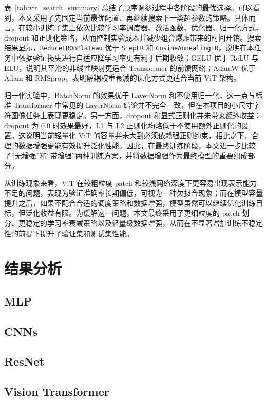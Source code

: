 \documentclass[12pt,hyperref,a4paper,UTF8]{ctexart}
\begin{document}
\noindent 表~\ref{tab:vit_search_summary} 总结了顺序调参过程中各阶段的最优选择。可以看到，本文采用了先固定当前最优配置、再继续搜索下一类超参数的策略。具体而言，在较小训练子集上依次比较学习率调度器、激活函数、优化器、归一化方式、dropout 和正则化策略，从而控制实验成本并减少组合爆炸带来的时间开销。搜索结果显示，\texttt{ReduceLROnPlateau} 优于 \texttt{StepLR} 和 \texttt{CosineAnnealingLR}，说明在本任务中依据验证损失进行自适应降学习率更有利于后期收敛；GELU 优于 ReLU 与 ELU，说明其平滑的非线性映射更适合 Transformer 的前馈网络；AdamW 优于 Adam 和 RMSprop，表明解耦权重衰减的优化方式更适合当前 ViT 架构。

归一化实验中，BatchNorm 的效果优于 LayerNorm 和不使用归一化，这一点与标准 Transformer 中常见的 LayerNorm 结论并不完全一致，但在本项目的小尺寸字符图像任务上表现更稳定。另一方面，dropout 和显式正则化并未带来额外收益：dropout 为 0.0 时效果最好，L1 与 L2 正则化均略低于不使用额外正则化的设置。这说明当前轻量化 ViT 的容量并未大到必须依赖强正则约束，相比之下，合理的数据增强更能有效提升泛化性能。因此，在最终训练阶段，本文进一步比较了“无增强”和“带增强”两种训练方案，并将数据增强作为最终模型的重要组成部分。

从训练现象来看，ViT 在较粗粒度 patch 和较浅网络深度下更容易出现表示能力不足的问题，表现为验证准确率长期偏低，可视为一种欠拟合现象；而在模型容量提升之后，如果不配合合适的调度策略和数据增强，模型虽然可以继续优化训练目标，但泛化收益有限。为缓解这一问题，本文最终采用了更细粒度的 patch 划分、更稳定的学习率衰减策略以及轻量级数据增强，从而在不显著增加训练不稳定性的前提下提升了验证集和测试集性能。


\section{结果分析}

\subsection{MLP}


\subsection{CNNs}


\subsection{ResNet}


\subsection{Vision Transformer}
\end{document}
